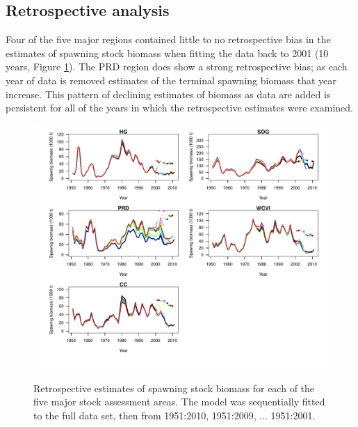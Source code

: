 \subsection{Retrospective analysis}
Four of the five major regions contained little to no retrospective bias in the estimates of spawning stock biomass when fitting the data back to 2001 (10 years, Figure \ref{fig:PartII:sbRetrospective}).  The PRD region does show a strong retrospective bias; as each year of data is removed estimates of the terminal spawning biomass that year increase.  This pattern of declining estimates of biomass as data are added is persistent for all of the years in which the retrospective estimates were examined.


\begin{figure}[!tbp]
	\includegraphics[width=\textwidth]{../FIGS/qPriorFigs/iscam_fig_sbt_retrospective.pdf}\\
	\caption{Retrospective estimates of spawning stock biomass for each of the five major stock assessment areas.  The model was sequentially fitted to the full data set, then from 1951:2010, 1951:2009, ... 1951:2001.}\label{fig:PartII:sbRetrospective}
\end{figure}


